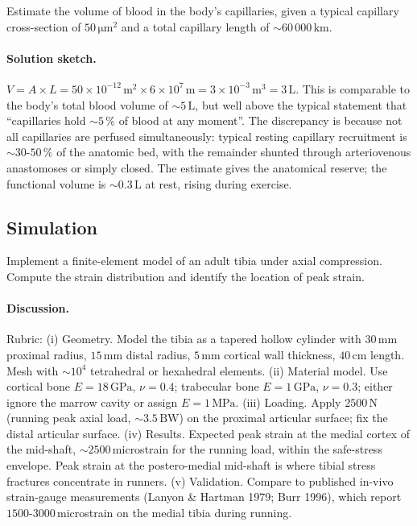 \begin{exercise}
Estimate the volume of blood in the body's capillaries, given a
typical capillary cross-section of $50\,\si{\micro\meter}^2$ and a
total capillary length of $\sim 60\,000\,\text{km}$.
\end{exercise}

\paragraph{Solution sketch.}
$V = A \times L = 50 \times 10^{-12}\,\text{m}^2 \times 6 \times 10^{7}\,\text{m}
= 3 \times 10^{-3}\,\text{m}^3 = 3\,\text{L}$. This is comparable to
the body's total blood volume of $\sim 5\,\text{L}$, but well above
the typical statement that ``capillaries hold $\sim 5\,\%$ of blood
at any moment''. The discrepancy is because not all capillaries are
perfused simultaneously: typical resting capillary recruitment is
$\sim 30\text{-}50\,\%$ of the anatomic bed, with the remainder
shunted through arteriovenous anastomoses or simply closed. The
estimate gives the anatomical reserve; the functional volume is
$\sim 0.3\,\text{L}$ at rest, rising during exercise.

\subsection*{Simulation}

\begin{exercise}
Implement a finite-element model of an adult tibia under axial
compression. Compute the strain distribution and identify the
location of peak strain.
\end{exercise}

\paragraph{Discussion.}
Rubric: (i) Geometry. Model the tibia as a tapered hollow cylinder
with $30\,\text{mm}$ proximal radius, $15\,\text{mm}$ distal radius,
$5\,\text{mm}$ cortical wall thickness, $40\,\text{cm}$ length.
Mesh with $\sim 10^4$ tetrahedral or hexahedral elements.
(ii) Material model. Use cortical bone $E = 18\,\text{GPa}$,
$\nu = 0.4$; trabecular bone $E = 1\,\text{GPa}$, $\nu = 0.3$;
either ignore the marrow cavity or assign $E = 1\,\text{MPa}$.
(iii) Loading. Apply $2500\,\text{N}$ (running peak axial load,
$\sim 3.5\,\text{BW}$) on the proximal articular surface;
fix the distal articular surface.
(iv) Results. Expected peak strain at the medial cortex of the
mid-shaft, $\sim 2500\,$microstrain for the running load, within
the safe-stress envelope. Peak strain at the postero-medial
mid-shaft is where tibial stress fractures concentrate in runners.
(v) Validation. Compare to published in-vivo strain-gauge
measurements (Lanyon \& Hartman 1979; Burr 1996), which report
$1500\text{-}3000\,$microstrain on the medial tibia during running.

